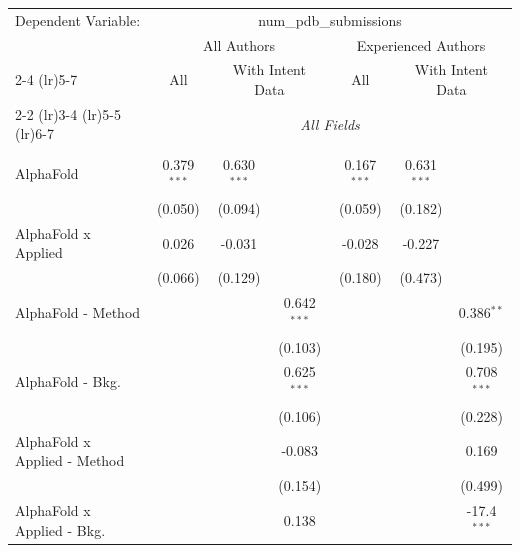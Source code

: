 \begingroup
\centering
\begin{tabular}{lcccccc}
   \tabularnewline \midrule \midrule
   Dependent Variable: & \multicolumn{6}{c}{num\_pdb\_submissions}\\
 & \multicolumn{3}{c}{All Authors} & \multicolumn{3}{c}{Experienced Authors} \\
\cmidrule(lr){2-4} \cmidrule(lr){5-7}
 & \multicolumn{1}{c}{All} & \multicolumn{2}{c}{With Intent Data} & \multicolumn{1}{c}{All} & \multicolumn{2}{c}{With Intent Data} \\
\cmidrule(lr){2-2} \cmidrule(lr){3-4} \cmidrule(lr){5-5} \cmidrule(lr){6-7}
 & \multicolumn{6}{c}{\textit{All Fields}} \\ \\
   AlphaFold                      & 0.379$^{***}$ & 0.630$^{***}$ &               & 0.167$^{***}$ & 0.631$^{***}$  &   \\   
                                  & (0.050)       & (0.094)       &               & (0.059)       & (0.182)        &   \\   
   AlphaFold x Applied            & 0.026         & -0.031        &               & -0.028        & -0.227         &   \\   
                                  & (0.066)       & (0.129)       &               & (0.180)       & (0.473)        &   \\   
   AlphaFold - Method             &               &               & 0.642$^{***}$ &               &                & 0.386$^{**}$\\   
                                  &               &               & (0.103)       &               &                & (0.195)\\   
   AlphaFold - Bkg.               &               &               & 0.625$^{***}$ &               &                & 0.708$^{***}$\\   
                                  &               &               & (0.106)       &               &                & (0.228)\\   
   AlphaFold x Applied - Method   &               &               & -0.083        &               &                & 0.169\\   
                                  &               &               & (0.154)       &               &                & (0.499)\\   
   AlphaFold x Applied - Bkg.     &               &               & 0.138         &               &                & -17.4$^{***}$\\   

\end{tabular}
